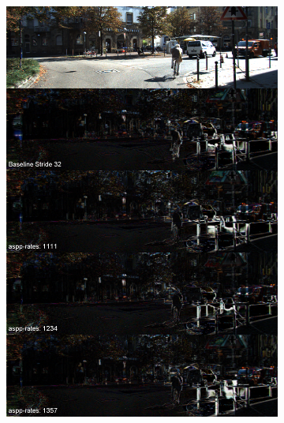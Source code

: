 \begin{figure}[h!]
\centering
\begin{subfigure}[c]{0.24\textwidth}
\includegraphics[width=\textwidth]{images/visual_comparisons/reconstruction_error/concat_003.png}
\end{subfigure}
\begin{subfigure}[c]{0.24\textwidth}

\end{subfigure}
\end{figure}
